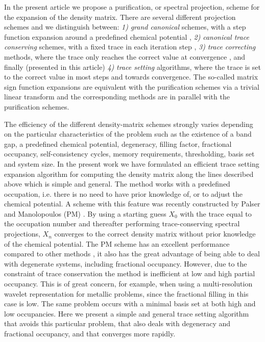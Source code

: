 \commentoutA{\documentclass[superbib,aps,prb,epsfig,floats,twocolumn]{revtex4}}
\begin{document}
In the present article we propose a purification, or spectral projection,
scheme for the expansion of the density matrix. There are several different
projection schemes and we distinguish between: {\it 1)} {\it grand canonical}
schemes, with a step function  expansion around a predefined chemical potential \cite{McWeeny60},
{\it 2)} {\it canonical trace conserving} schemes, with a fixed trace
in each iteration step \cite{Palser98}, {\it 3)} {\it trace correcting} methods,
where the trace only reaches the correct value at convergence \cite{Niklasson02b}, 
and finally (presented in this article) {\it 4)} {\it trace setting} algorithms, where the trace is set 
to the correct value in most steps and towards convergence. The so-called matrix sign function
expansions are equivalent with the purification schemes via a trivial
linear transform and the corresponding methods are in parallel with the purification schemes.

The efficiency of the different density-matrix schemes strongly
varies depending on the particular characteristics of the problem such as
the existence of a band gap, a predefined chemical potential, degeneracy, filling factor, 
fractional occupancy, self-consistency cycles, memory requirements, thresholding, 
basis set and system size. 
In the present work we have formulated an efficient trace setting expansion 
algorithm for computing the density matrix along the lines described above which
is simple and general. The method works with a predefined occupation, i.e.
there is no need to have prior knowledge of, or to adjust the chemical potential. 
A scheme with this feature was recently constructed by Palser and Manolopoulos 
(PM) \cite{Palser98}. By using a starting guess $X_0$ with the trace equal to 
the occupation number and thereafter performing trace-conserving
spectral projections, $X_n$ converges to the correct density matrix without
prior knowledge of the chemical potential. The PM scheme has an excellent
performance compared to other methods \cite{Daniels99,Palser98}, it also
has the great advantage of being able to deal with degenerate systems,
including fractional occupancy.
However, due to the constraint of trace conservation the method is inefficient
at low and high partial occupancy. This is of great concern,
for example, when using a multi-resolution wavelet representation for metallic problems,
since the fractional filling in this case is low. The same
problem occurs with a minimal basis set at both high and low
occupancies. Here we present a simple and general trace setting algorithm that avoids 
this particular problem, that also deals with degeneracy and fractional occupancy,
and that converges more rapidly.
\end{document}
